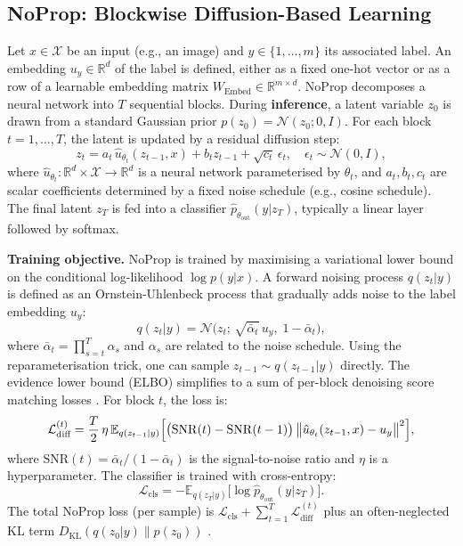 \documentclass[preprint,12pt]{elsarticle}
\begin{document}
\subsection{NoProp: Blockwise Diffusion-Based Learning}
\label{sec:noprop-recall}

Let $x\in\mathcal{X}$ be an input (e.g., an image) and $y\in\{1,\dots,m\}$ its associated label. An embedding $u_y\in\mathbb{R}^d$ of the label is defined, either as a fixed one-hot vector or as a row of a learnable embedding matrix $W_{\text{Embed}}\in\mathbb{R}^{m\times d}$. NoProp \cite{li2025noprop} decomposes a neural network into $T$ sequential blocks. During \textbf{inference}, a latent variable $z_0$ is drawn from a standard Gaussian prior $p(z_0)=\mathcal{N}(z_0;0,I)$. For each block $t=1,\dots,T$, the latent is updated by a residual diffusion step:
\begin{equation}
\label{eq:inference-step}
z_t = a_t\,\hat{u}_{\theta_t}(z_{t-1},x) + b_t z_{t-1} + \sqrt{c_t}\,\epsilon_t,\quad \epsilon_t\sim\mathcal{N}(0,I),
\end{equation}
where $\hat{u}_{\theta_t}:\mathbb{R}^d\times\mathcal{X}\to\mathbb{R}^d$ is a neural network parameterised by $\theta_t$, and $a_t,b_t,c_t$ are scalar coefficients determined by a fixed noise schedule (e.g., cosine schedule). The final latent $z_T$ is fed into a classifier $\hat{p}_{\theta_{\text{out}}}(y|z_T)$, typically a linear layer followed by softmax.

\textbf{Training objective.} NoProp is trained by maximising a variational lower bound on the conditional log-likelihood $\log p(y|x)$. A forward noising process $q(z_t|y)$ is defined as an Ornstein-Uhlenbeck process that gradually adds noise to the label embedding $u_y$:
\begin{equation}
\label{eq:noising-process}
q(z_t|y) = \mathcal{N}\bigl(z_t;\,\sqrt{\bar\alpha_t}\,u_y,\;1-\bar\alpha_t\bigr),
\end{equation}
where $\bar\alpha_t=\prod_{s=t}^T\alpha_s$ and $\alpha_s$ are related to the noise schedule. Using the reparameterisation trick, one can sample $z_{t-1}\sim q(z_{t-1}|y)$ directly. The evidence lower bound (ELBO) simplifies to a sum of per-block denoising score matching losses \cite{li2025noprop,song2021maximum}. For block $t$, the loss is:
\begin{equation}
\label{eq:diffusion-loss}
\mathcal{L}_{\text{diff}}^{(t)} = \frac{T}{2}\,\eta\,\mathbb{E}_{q(z_{t-1}|y)}\Bigl[ \bigl(\mathrm{SNR}(t)-\mathrm{SNR}(t-1)\bigr)\,\bigl\|\hat{u}_{\theta_t}(z_{t-1},x)-u_y\bigr\|^2 \Bigr],
\end{equation}
where $\mathrm{SNR}(t)=\bar\alpha_t/(1-\bar\alpha_t)$ is the signal-to-noise ratio and $\eta$ is a hyperparameter. The classifier is trained with cross-entropy:
\begin{equation}
\label{eq:classification-loss}
\mathcal{L}_{\text{cls}} = -\mathbb{E}_{q(z_T|y)}\bigl[\log\hat{p}_{\theta_{\text{out}}}(y|z_T)\bigr].
\end{equation}
The total NoProp loss (per sample) is $\mathcal{L}_{\text{cls}} + \sum_{t=1}^T\mathcal{L}_{\text{diff}}^{(t)}$ plus an often-neglected KL term $D_{\text{KL}}(q(z_0|y)\|p(z_0))$ \cite{li2025noprop}.
\end{document}

